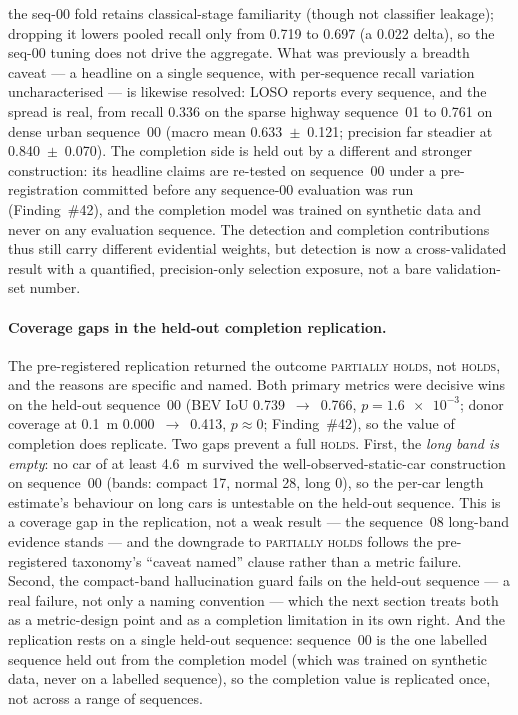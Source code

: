 the seq-00 fold retains classical-stage familiarity (though not classifier leakage);
dropping it lowers pooled recall only from \num{0.719} to \num{0.697} (a \num{0.022}
delta), so the seq-00 tuning does not drive the aggregate. What was previously a breadth
caveat --- a headline on a single sequence, with per-sequence recall variation
uncharacterised --- is likewise resolved: LOSO reports every sequence, and the spread is
real, from recall \num{0.336} on the sparse highway sequence~01 to \num{0.761} on dense
urban sequence~00 (macro mean \num{0.633}~$\pm$~\num{0.121}; precision far steadier at
\num{0.840}~$\pm$~\num{0.070}). The completion side is held out by a different and
stronger construction: its headline claims are re-tested on sequence~00 under a
pre-registration committed before any sequence-00 evaluation was run (Finding~\#42), and
the completion model was trained on synthetic data and never on any evaluation sequence.
The detection and completion contributions thus still carry different evidential weights,
but detection is now a cross-validated result with a quantified, precision-only selection
exposure, not a bare validation-set number.

\paragraph{Coverage gaps in the held-out completion replication.}
The pre-registered replication returned the outcome \textsc{partially holds}, not
\textsc{holds}, and the reasons are specific and named. Both primary metrics were
decisive wins on the held-out sequence~00 (BEV IoU \num{0.739}~$\rightarrow$~\num{0.766},
$p=\num{1.6e-3}$; donor coverage at \SI{0.1}{\metre} \num{0.000}~$\rightarrow$~\num{0.413},
$p\approx0$; Finding~\#42), so the value of completion does replicate. Two gaps prevent a
full \textsc{holds}. First, the \emph{long band is empty}: no car of at least
\SI{4.6}{\metre} survived the well-observed-static-car construction on sequence~00
(bands: compact \num{17}, normal \num{28}, long \num{0}), so the per-car length estimate's
behaviour on long cars is untestable on the held-out sequence. This is a coverage gap in
the replication, not a weak result --- the sequence~08 long-band evidence stands --- and
the downgrade to \textsc{partially holds} follows the pre-registered taxonomy's
``caveat named'' clause rather than a metric failure. Second, the compact-band
hallucination guard fails on the held-out sequence --- a real failure, not only a naming
convention --- which the next section treats both as a metric-design point and as a
completion limitation in its own right. And the replication rests on a single held-out
sequence: sequence~00 is the one labelled sequence held out from the completion model
(which was trained on synthetic data, never on a labelled sequence), so the completion
value is replicated once, not across a range of sequences.

